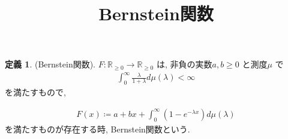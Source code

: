 \documentclass[10pt, fleqn, label-section=none]{bxjsarticle}
\title{Bernstein関数}
\date{}
\author{}
\theoremstyle{definition}
\newtheorem{dfn}{定義}[section]
\renewcommand{\;}{\, ; \,}
\begin{document}
\maketitle

\section{}

\begin{dfn}(Bernstein関数). $F: \mathbb R _{\geq 0} \rightarrow \mathbb R_{\geq 0} $ は, 非負の実数$a, b \geq 0$ と測度$\mu$ で
\begin{align*} \int_{0}^\infty \frac{\lambda}{1 + \lambda} d \mu(\lambda) < \infty \end{align*} 
を満たすもので, 

\begin{align*} F(x) \coloneqq a + bx + \int_0^\infty (1 - e^{- \lambda x}  ) d \mu(\lambda )\end{align*}
を満たすものが存在する時, Bernstein関数という. 
\end{dfn}
\end{document}
